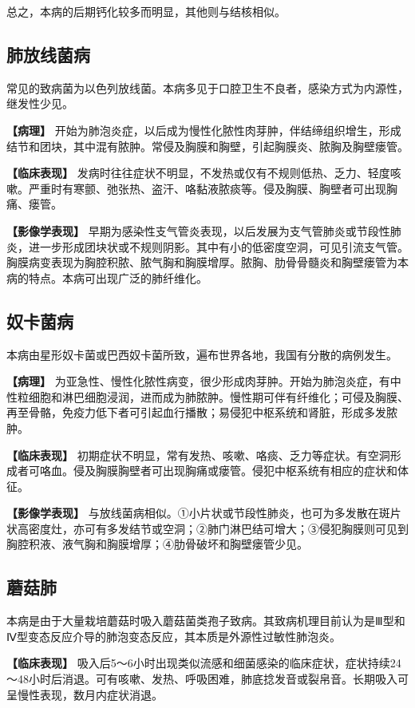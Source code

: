 总之，本病的后期钙化较多而明显，其他则与结核相似。

\subsection{肺放线菌病}

常见的致病菌为以色列放线菌。本病多见于口腔卫生不良者，感染方式为内源性，继发性少见。

\textbf{【病理】}
开始为肺泡炎症，以后成为慢性化脓性肉芽肿，伴结缔组织增生，形成结节和团块，其中混有脓肿。常侵及胸膜和胸壁，引起胸膜炎、脓胸及胸壁瘘管。

\textbf{【临床表现】}
发病时往往症状不明显，不发热或仅有不规则低热、乏力、轻度咳嗽。严重时有寒颤、弛张热、盗汗、咯黏液脓痰等。侵及胸膜、胸壁者可出现胸痛、瘘管。

\textbf{【影像学表现】}
早期为感染性支气管炎表现，以后发展为支气管肺炎或节段性肺炎，进一步形成团块状或不规则阴影。其中有小的低密度空洞，可见引流支气管。胸膜病变表现为胸腔积脓、脓气胸和胸膜增厚。脓胸、肋骨骨髓炎和胸壁瘘管为本病的特点。本病可出现广泛的肺纤维化。

\subsection{奴卡菌病}

本病由星形奴卡菌或巴西奴卡菌所致，遍布世界各地，我国有分散的病例发生。

\textbf{【病理】}
为亚急性、慢性化脓性病变，很少形成肉芽肿。开始为肺泡炎症，有中性粒细胞和淋巴细胞浸润，进而成为肺脓肿。慢性期可伴有纤维化；可侵及胸膜、再至骨骼，免疫力低下者可引起血行播散；易侵犯中枢系统和肾脏，形成多发脓肿。

\textbf{【临床表现】}
初期症状不明显，常有发热、咳嗽、咯痰、乏力等症状。有空洞形成者可咯血。侵及胸膜胸壁者可出现胸痛或瘘管。侵犯中枢系统有相应的症状和体征。

\textbf{【影像学表现】}
与放线菌病相似。①小片状或节段性肺炎，也可为多发散在斑片状高密度灶，亦可有多发结节或空洞；②肺门淋巴结可增大；③侵犯胸膜则可见到胸腔积液、液气胸和胸膜增厚；④肋骨破坏和胸壁瘘管少见。

\subsection{蘑菇肺}

本病是由于大量栽培蘑菇时吸入蘑菇菌类孢子致病。其致病机理目前认为是Ⅲ型和Ⅳ型变态反应介导的肺泡变态反应，其本质是外源性过敏性肺泡炎。

\textbf{【临床表现】}
吸入后5～6小时出现类似流感和细菌感染的临床症状，症状持续24～48小时后消退。可有咳嗽、发热、呼吸困难，肺底捻发音或裂帛音。长期吸入可呈慢性表现，数月内症状消退。

